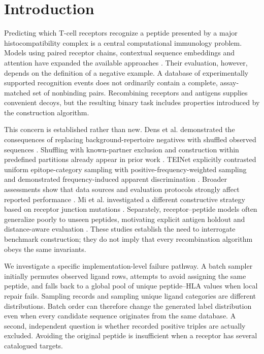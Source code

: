 \documentclass[pdflatex,sn-basic]{sn-jnl}
\begin{document}
\section{Introduction}\label{sec:intro}
Predicting which T-cell receptors recognize a peptide presented by a major histocompatibility complex is a central computational immunology problem. Models using paired receptor chains, contextual sequence embeddings and attention have expanded the available approaches \citep{Montemurro2021,Weber2021,Korpela2023}. Their evaluation, however, depends on the definition of a negative example. A database of experimentally supported recognition events does not ordinarily contain a complete, assay-matched set of nonbinding pairs. Recombining receptors and antigens supplies convenient decoys, but the resulting binary task includes properties introduced by the construction algorithm.

This concern is established rather than new. Dens et al. demonstrated the consequences of replacing background-repertoire negatives with shuffled observed sequences \citep{Dens2023}. Shuffling with known-partner exclusion and construction within predefined partitions already appear in prior work \citep{Moris2021,Korpela2023}. TEINet explicitly contrasted uniform epitope-category sampling with positive-frequency-weighted sampling and demonstrated frequency-induced apparent discrimination \citep{Jiang2023}. Broader assessments show that data sources and evaluation protocols strongly affect reported performance \citep{Deng2023,Drost2025,Lu2026}. Mi et al. investigated a different constructive strategy based on receptor junction mutations \citep{Mi2026}. Separately, receptor--peptide models often generalize poorly to unseen peptides, motivating explicit antigen holdout and distance-aware evaluation \citep{Grazioli2022,Castorina2025}. These studies establish the need to interrogate benchmark construction; they do not imply that every recombination algorithm obeys the same invariants.

We investigate a specific implementation-level failure pathway. A batch sampler initially permutes observed ligand rows, attempts to avoid assigning the same peptide, and falls back to a global pool of unique peptide--HLA values when local repair fails. Sampling records and sampling unique ligand categories are different distributions. Batch order can therefore change the generated label distribution even when every candidate sequence originates from the same database. A second, independent question is whether recorded positive triples are actually excluded. Avoiding the original peptide is insufficient when a receptor has several catalogued targets.
\end{document}
